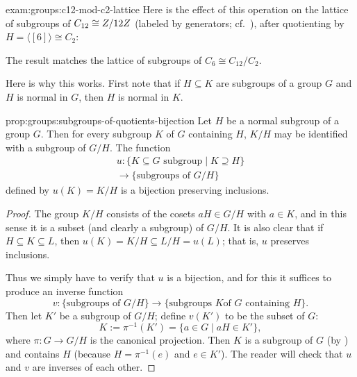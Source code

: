 \begin{exam}{}{exam:groups:c12-mod-c2-lattice}
  Here is the effect of this operation on the lattice of subgroups of
  $C_{12} \cong Z/12Z$ (labeled by generators; cf.\
  ), after
  quotienting by $H = \langle [6] \rangle \cong C_2$:


  The result matches the lattice of subgroups of
  $C_6 \cong C_{12}/C_2$.
\end{exam}

Here is why this works. First note that if $H \subseteq K$ are
subgroups of a group $G$ and $H$ is normal in $G$, then $H$ is normal
in $K$.

\begin{prop}{}{prop:groups:subgroups-of-quotients-bijection}
  Let $H$ be a normal subgroup of a group $G$. Then for
every subgroup $K$ of $G$ containing $H$, $K/H$ may be identified with
a subgroup of $G/H$. The function
\[
  \begin{gathered}
    u : \{K \subseteq G \text{ subgroup} \mid K \supseteq H\} \\
    \to \{\text{subgroups of } G/H\}
  \end{gathered}
\]
defined by $u(K) = K/H$ is a bijection preserving
inclusions.
\end{prop}
\begin{proof}
  The group $K/H$ consists of the cosets $aH \in G/H$ with $a \in K$,
  and in this sense it is a subset (and clearly a subgroup) of
  $G/H$. It is also clear that if $H \subseteq K \subseteq L$, then
  $u(K) = K/H \subseteq L/H = u(L)$; that is, $u$ preserves
  inclusions.

  Thus we simply have to verify that $u$ is a bijection, and for this
  it suffices to produce an inverse function
  \[
    v : \{\text{subgroups of } G/H\} \to \{\text{subgroups } K \text{
      of } G \text{ containing } H\}.
  \]
  Then let $K'$ be a subgroup of $G/H$; define $v(K')$ to be the
  subset of $G$:
  \[
    K := \pi^{-1}(K') = \{a \in G \mid aH \in K'\},
  \]
  where $\pi : G \to G/H$ is the canonical projection. Then $K$ is a
  subgroup of $G$ (by \Cref{lem:groups:preimage-of-subgroup}) and
  contains $H$ (because $H = \pi^{-1}(e)$ and $e \in K'$). The reader
  will check that $u$ and $v$ are inverses of each other.
\end{proof}

